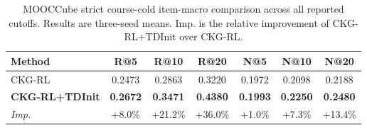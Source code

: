 \begin{table}[t]
\centering
{
\small
\setlength{\tabcolsep}{5.0pt}
\renewcommand{\arraystretch}{0.98}
\begin{tabular*}{\textwidth}{@{\extracolsep{\fill}}lcccccc}
\toprule
Method & R@5 & R@10 & R@20 & N@5 & N@10 & N@20 \\
\midrule
CKG-RL & 0.2473 & 0.2863 & 0.3220 & 0.1972 & 0.2098 & 0.2188 \\
\textbf{CKG-RL+TDInit} & \textbf{0.2672} & \textbf{0.3471} & \textbf{0.4380} & \textbf{0.1993} & \textbf{0.2250} & \textbf{0.2480} \\
\midrule
\emph{Imp.} & +8.0\% & +21.2\% & +36.0\% & +1.0\% & +7.3\% & +13.4\% \\
\bottomrule
\end{tabular*}
}
\caption{MOOCCube strict course-cold item-macro comparison across all reported cutoffs. Results are three-seed means. Imp. is the relative improvement of CKG-RL+TDInit over CKG-RL.}
\label{tab:ckg-rl-tdinit-all-metrics}
\end{table}
